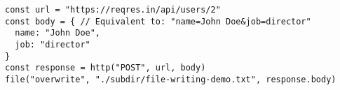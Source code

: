 \vspace{-2.5em}
\begin{center}
\begin{minipage}[t]{1\textwidth}
\begin{listing}[H]
\begin{spacing}{0.6}
\begin{verbatim}
const url = "https://reqres.in/api/users/2"
const body = { // Equivalent to: "name=John Doe&job=director"
  name: "John Doe",
  job: "director"
}
const response = http("POST", url, body)
file("overwrite", "./subdir/file-writing-demo.txt", response.body)
\end{verbatim}
\end{spacing}
\end{listing}
\end{minipage}
\end{center}
